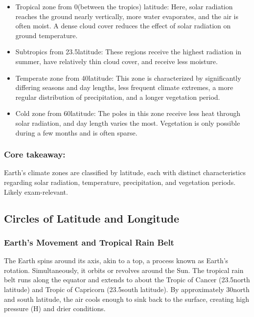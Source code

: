 \begin{itemize} 
    \item Tropical zone from 0\textdegree (between the tropics) latitude: Here, solar radiation reaches the ground nearly vertically, more water evaporates, and the air is often moist. A dense cloud cover reduces the effect of solar radiation on ground temperature. 
    \item Subtropics from 23.5\textdegree latitude: These regions receive the highest radiation in summer, have relatively thin cloud cover, and receive less moisture. 
    \item Temperate zone from 40\textdegree latitude: This zone is characterized by significantly differing seasons and day lengths, less frequent climate extremes, a more regular distribution of precipitation, and a longer vegetation period. 
    \item Cold zone from 60\textdegree latitude: The poles in this zone receive less heat through solar radiation, and day length varies the most. Vegetation is only possible during a few months and is often sparse. 
\end{itemize}

\subsubsection*{Core takeaway:} 
Earth's climate zones are classified by latitude, each with distinct characteristics regarding solar radiation, temperature, precipitation, and vegetation periods. Likely exam-relevant.


\subsection{Circles of Latitude and Longitude} 
\subsubsection{Earth's Movement and Tropical Rain Belt} 
The Earth spins around its axis, akin to a top, a process known as Earth's rotation. Simultaneously, it orbits or revolves around the Sun. The tropical rain belt runs along the equator and extends to about the Tropic of Cancer (23.5\textdegree north latitude) and Tropic of Capricorn (23.5\textdegree south latitude). By approximately 30\textdegree north and south latitude, the air cools enough to sink back to the surface, creating high pressure (H) and drier conditions.
